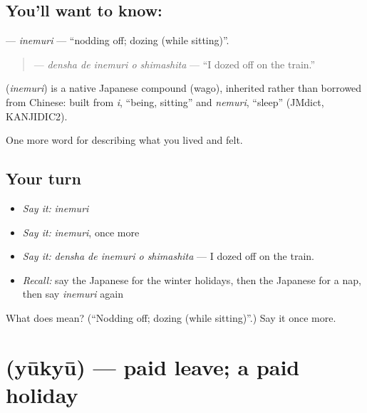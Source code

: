 \subsection*{You'll want to know: }
\textbf{} — \emph{inemuri} — \textquotedblleft{}nodding off; dozing (while sitting)\textquotedblright{}.

\begin{quote}
\textbf{  } — \emph{densha de inemuri o shimashita} — \textquotedblleft{}I dozed off on the train.\textquotedblright{}
\end{quote}

\begin{cousinweb}
\textbf{} (\emph{inemuri}) is a native Japanese compound (wago), inherited rather than borrowed from Chinese: built from \emph{i}, \textquotedblleft{}being, sitting\textquotedblright{} and \emph{nemuri}, \textquotedblleft{}sleep\textquotedblright{} (JMdict, KANJIDIC2).
\end{cousinweb}

\begin{grammarlens}[title={What you've built}]
One more word for describing what you lived and felt.
\end{grammarlens}

\subsection*{Your turn}
\begin{itemize}
\raggedright
  \item \emph{Say it:} \emph{inemuri}
  \item \emph{Say it:} \emph{inemuri}, once more
  \item \emph{Say it:} \emph{densha de inemuri o shimashita} — I dozed off on the train.
  \item \emph{Recall:} say the Japanese for the winter holidays, then the Japanese for a nap, then say \emph{inemuri} again
\end{itemize}

\begin{tcolorbox}[breakable,colback=teal!4,colframe=teal!35!black,title={Before you move on}]
What does  mean? (\textquotedblleft{}Nodding off; dozing (while sitting)\textquotedblright{}.) Say it once more.
\end{tcolorbox}
\section[\texorpdfstring{\ja{ゆうきゅう} (yūkyū)}{ゆうきゅう (yūkyū)}]{ (yūkyū) — paid leave; a paid holiday}

